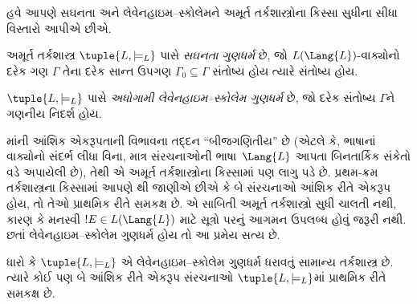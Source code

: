 \begingroup
\makeatletter{}\makeatother


\label{guunit:OLP-0206}


હવે આપણે સઘનતા અને લેવેનહાઇમ--સ્કોલેમને અમૂર્ત તર્કશાસ્ત્રોના કિસ્સા
સુધીના સીધા વિસ્તારો આપીએ છીએ.

\begin{defn}
અમૂર્ત તર્કશાસ્ત્ર $\tuple{L, \models_L}$ પાસે \emph{સઘનતા
  ગુણધર્મ} છે, જો $L(\Lang{L})$-વાક્યોનો દરેક ગણ $\Gamma$ તેના
દરેક સાન્ત ઉપગણ $\Gamma_0 \subseteq \Gamma$ સંતોષ્ય હોય ત્યારે સંતોષ્ય
હોય.
\end{defn}

\begin{defn}
$\tuple{L, \models_L}$ પાસે \emph{અધોગામી લેવેનહાઇમ--સ્કોલેમ
  ગુણધર્મ} છે, જો દરેક સંતોષ્ય $\Gamma$ને ગણનીય નિદર્શ હોય.
\end{defn}


માંની આંશિક એકરૂપતાની વિભાવના તદ્દન
``બીજગણિતીય'' છે (એટલે કે, ભાષાનાં વાક્યોનો સંદર્ભ લીધા વિના,
માત્ર સંરચનાઓની ભાષા~$\Lang{L}$ આપતા બિનતાર્કિક સંકેતો
વડે અપાયેલી છે), તેથી એ અમૂર્ત તર્કશાસ્ત્રોના કિસ્સામાં પણ લાગુ પડે છે.
પ્રથમ-ક્રમ તર્કશાસ્ત્રના કિસ્સામાં આપણે
થી જાણીએ છીએ કે બે સંરચનાઓ આંશિક
રીતે એકરૂપ હોય, તો તેઓ પ્રાથમિક રીતે સમકક્ષ છે. એ સાબિતી અમૂર્ત
તર્કશાસ્ત્રો સુધી ચાલતી નથી, કારણ કે મનસ્વી $!E \in L(\Lang{L})$ માટે
સૂત્રો પરનું આગમન ઉપલબ્ધ હોવું જરૂરી નથી. છતાં લેવેનહાઇમ--સ્કોલેમ
ગુણધર્મ હોય તો આ પ્રમેય સત્ય છે.

\begin{thm}
ધારો કે $\tuple{L, \models_L}$ એ લેવેનહાઇમ--સ્કોલેમ ગુણધર્મ ધરાવતું
સામાન્ય તર્કશાસ્ત્ર છે. ત્યારે કોઈ પણ બે આંશિક રીતે એકરૂપ
સંરચનાઓ $\tuple{L, \models_L}$માં પ્રાથમિક રીતે સમકક્ષ છે.
\end{thm}

